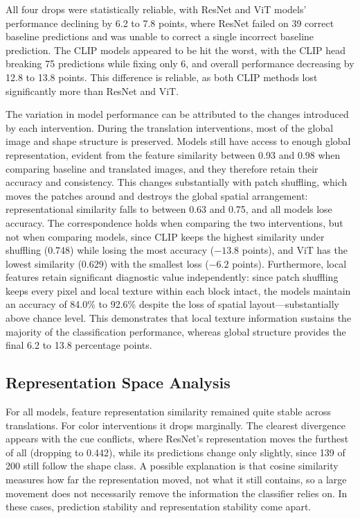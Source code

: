 All four drops were statistically reliable, with ResNet and ViT models' performance declining by 6.2 to 7.8 points, where ResNet failed on 39 correct baseline predictions and was unable to correct a single incorrect baseline prediction. The CLIP models appeared to be hit the worst, with the CLIP head breaking 75 predictions while fixing only 6, and overall performance decreasing by 12.8 to 13.8 points. This difference is reliable, as both CLIP methods lost significantly more than ResNet and ViT.

The variation in model performance can be attributed to the changes introduced by each intervention. During the translation interventions, most of the global image and shape structure is preserved. Models still have access to enough global representation, evident from the feature similarity between 0.93 and 0.98 when comparing baseline and translated images, and they therefore retain their accuracy and consistency. This changes substantially with patch shuffling, which moves the patches around and destroys the global spatial arrangement: representational similarity falls to between 0.63 and 0.75, and all models lose accuracy. The correspondence holds when comparing the two interventions, but not when comparing models, since CLIP keeps the highest similarity under shuffling (0.748) while losing the most accuracy ($-13.8$ points), and ViT has the lowest similarity (0.629) with the smallest loss ($-6.2$ points). Furthermore, local features retain significant diagnostic value independently: since patch shuffling keeps every pixel and local texture within each block intact, the models maintain an accuracy of 84.0\% to 92.6\% despite the loss of spatial layout---substantially above chance level. This demonstrates that local texture information sustains the majority of the classification performance, whereas global structure provides the final 6.2 to 13.8 percentage points.

\subsection{Representation Space Analysis}

For all models, feature representation similarity remained quite stable across translations. For color interventions it drops marginally. The clearest divergence appears with the cue conflicts, where ResNet's representation moves the furthest of all (dropping to 0.442), while its predictions change only slightly, since 139 of 200 still follow the shape class. A possible explanation is that cosine similarity measures how far the representation moved, not what it still contains, so a large movement does not necessarily remove the information the classifier relies on. In these cases, prediction stability and representation stability come apart.

